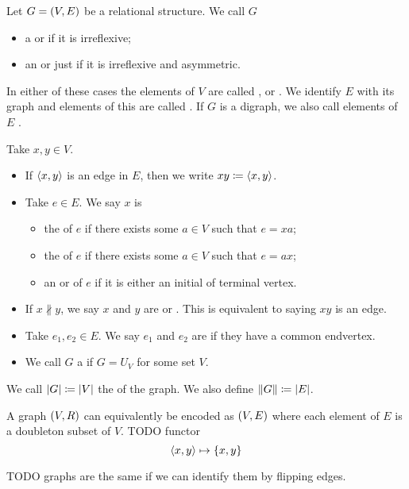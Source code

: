 \begin{definition}
Let $G = \left( V,E \right)$ be a relational structure. We call $G$
\begin{itemize}
\item a  or  if it is irreflexive;
\item an  or just  if it is irreflexive and asymmetric.
\end{itemize}
In either of these cases the elements of $V$ are called ,  or . We identify $E$ with its graph and elements of this are called . If $G$ is a digraph, we also call elements of $E$ .

Take $x,y \in V$.
\begin{itemize}
\item If $\left\langle x,y \right\rangle$ is an edge in $E$, then we write $xy \coloneqq \left\langle x,y \right\rangle$.
\item Take $e\in E$. We say $x$ is
\begin{itemize}
\item the  of $e$ if there exists some $a\in V$ such that $e = xa$;
\item the  of $e$ if there exists some $a\in V$ such that $e = ax$;
\item an  or  of $e$ if it is either an initial of terminal vertex.
\end{itemize}
\item If $x \nparallel y$, we say $x$ and $y$ are  or . This is equivalent to saying $xy$ is an edge.
\item Take $e_1,e_2 \in E$. We say $e_1$ and $e_2$ are  if they have a common endvertex.
\item We call $G$ a  if $G = U_V$ for some set $V$.
\end{itemize}

We call $|G| \coloneqq |V|$ the  of the graph. We also define $\lVert G\rVert \coloneqq |E|$.
\end{definition}

\begin{lemma}
A graph $\left( V,R \right)$ can equivalently be encoded as $\left( V, E \right)$ where each element of $E$ is a doubleton subset of $V$. TODO functor
\[ \left\langle x,y \right\rangle \mapsto \{x,y\} \]
\end{lemma}

TODO graphs are the same if we can identify them by flipping edges.

